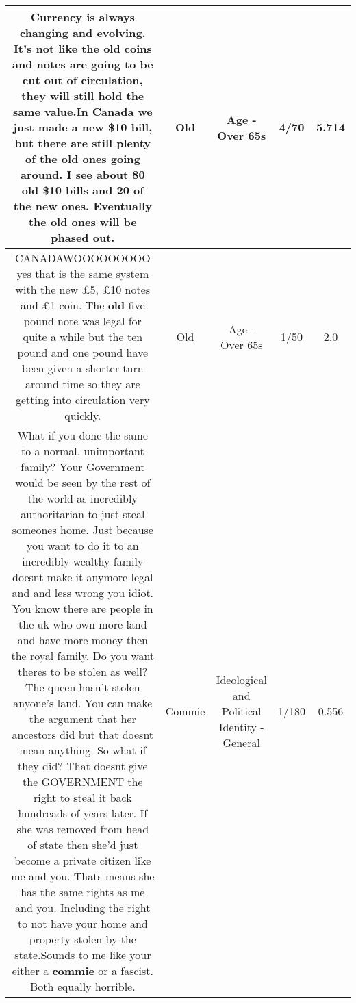 \documentclass[11pt]{article}
\newlength\mylength
\begin{document}
\begin{center}
\begin{longtable}{|C{.65\mylength}|C{.30\mylength}|C{.12\mylength}|C{.12\mylength}|C{.12\mylength}|}
  \small Currency is always changing and evolving. It's not like the \textbf{old} coins and notes are going to be cut out of circulation, they will still hold the same value.In Canada we just made a new \$10 bill, but there are still plenty of the \textbf{old} ones going around. I see about 80 \textbf{old} \$10 bills and 20 of the new ones. Eventually the \textbf{old} ones will be phased out.\normalsize   & Old & Age - Over 65s & 4/70 & 5.714 \\  \hline
  \small CANADAWOOOOOOOOO yes that is the same system with the new £5, £10 notes and £1 coin. The \textbf{old} five pound note was legal for quite a while but the ten pound and one pound have been given a shorter turn around time so they are getting into circulation very quickly.\normalsize   & Old & Age - Over 65s & 1/50 & 2.0 \\  \hline
  \small What if you done the same to a normal, unimportant family? Your Government would be seen by the rest of the world as incredibly authoritarian to just steal someones home. Just because you want to do it to an incredibly wealthy family doesnt make it anymore legal and and less wrong you idiot. You know there are people in the uk who own more land and have more money then the royal family. Do you want theres to be stolen as well? The queen hasn't stolen anyone's land. You can make the argument that her ancestors did but that doesnt mean anything. So what if they did? That doesnt give the GOVERNMENT the right to steal it back hundreads of years later. If she was removed from head of state then she'd just become a private citizen like me and you. Thats means she has the same rights as me and you. Including the right to not have your home and property stolen by the state.Sounds to me like your either a \textbf{commie} or a fascist. Both equally horrible.\normalsize   & Commie &  Ideological and Political Identity - General & 1/180 & 0.556 \\  \hline

\end{longtable}
\end{center}
\end{document}
